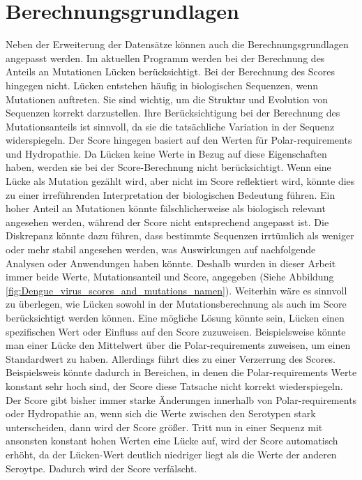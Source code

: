 \documentclass[german,version-2022-01]{uzl-thesis}
\begin{document}
\section{Berechnungsgrundlagen}
Neben der Erweiterung der Datens\"atze k\"onnen auch die Berechnungsgrundlagen angepasst werden. Im aktuellen Programm werden bei der Berechnung des Anteils an Mutationen L\"ucken ber\"ucksichtigt. Bei der Berechnung des Scores hingegen nicht. L\"ucken entstehen h\"aufig in biologischen Sequenzen, wenn Mutationen auftreten. Sie sind wichtig, um die Struktur und Evolution von Sequenzen korrekt darzustellen. Ihre Ber\"ucksichtigung bei der Berechnung des Mutationsanteils ist sinnvoll, da sie die tats\"achliche Variation in der Sequenz widerspiegeln. Der Score hingegen basiert auf den Werten f\"ur Polar-requirements und Hydropathie. Da L\"ucken keine Werte in Bezug auf diese Eigenschaften haben, werden sie bei der Score-Berechnung nicht ber\"ucksichtigt. Wenn eine L\"ucke als Mutation gez\"ahlt wird, aber nicht im Score reflektiert wird, k\"onnte dies zu einer irref\"uhrenden Interpretation der biologischen Bedeutung f\"uhren. Ein hoher Anteil an Mutationen k\"onnte f\"alschlicherweise als biologisch relevant angesehen werden, w\"ahrend der Score nicht entsprechend angepasst ist. Die Diskrepanz k\"onnte dazu f\"uhren, dass bestimmte Sequenzen irrt\"umlich als weniger oder mehr stabil angesehen werden, was Auswirkungen auf nachfolgende Analysen oder Anwendungen haben k\"onnte. Deshalb wurden in dieser Arbeit immer beide Werte, Mutationsanteil und Score, angegeben (Siehe Abbildung \ref{fig:Dengue_virus_scores_and_mutations_namen}). Weiterhin w\"are es sinnvoll zu \"uberlegen, wie L\"ucken sowohl in der Mutationsberechnung als auch im Score ber\"ucksichtigt werden k\"onnen. Eine m\"ogliche L\"osung k\"onnte sein, L\"ucken einen spezifischen Wert oder Einfluss auf den Score zuzuweisen. Beispielsweise k\"onnte man einer L\"ucke den Mittelwert \"uber die Polar-requirements zuweisen, um einen Standardwert zu haben. Allerdings f\"uhrt dies zu einer Verzerrung des Scores. Beispielsweis k\"onnte dadurch in Bereichen, in denen die Polar-requirements Werte konstant sehr hoch sind, der Score diese Tatsache nicht korrekt wiederspiegeln. Der Score gibt bisher immer starke \"Anderungen innerhalb von Polar-requirements oder Hydropathie an, wenn sich die Werte zwischen den Serotypen stark unterscheiden, dann wird der Score gr\"o\ss{}er. Tritt nun in einer Sequenz mit ansonsten konstant hohen Werten eine L\"ucke auf, wird der Score automatisch erh\"oht, da der L\"ucken-Wert deutlich niedriger liegt als die Werte der anderen Seroytpe. Dadurch wird der Score verf\"alscht.
\end{document}
